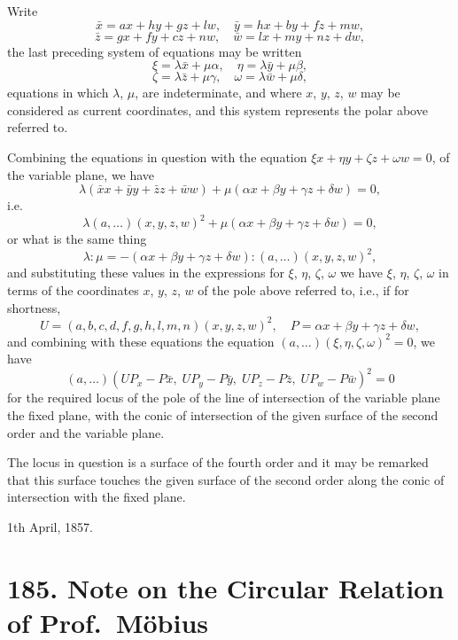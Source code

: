 \documentclass[12pt,a4paper]{article}
\theoremstyle{plain}
\theoremstyle{definition}
\begin{document}
\newpage
[184]

Write
\[
\bar{x} = ax + hy + gz + lw, \quad
\bar{y} = hx + by + fz + mw,
\]
\[
\bar{z} = gx + fy + cz + nw, \quad
\bar{w} = lx + my + nz + dw,
\]
the last preceding system of equations may be written
\[
\xi = \lambda \bar{x} + \mu \alpha, \quad
\eta = \lambda \bar{y} + \mu \beta,
\]
\[
\zeta = \lambda \bar{z} + \mu \gamma, \quad
\omega = \lambda \bar{w} + \mu \delta,
\]
equations in which $\lambda$, $\mu$, are indeterminate, and where $x$, $y$, $z$, $w$ may be considered as current coordinates, and this system represents the polar above referred to.

Combining the equations in question with the equation $\xi x + \eta y + \zeta z + \omega w = 0$, of the variable plane, we have
\[
\lambda(\bar{x}x + \bar{y}y + \bar{z}z + \bar{w}w) + \mu(\alpha x + \beta y + \gamma z + \delta w) = 0,
\]
i.e.
\[
\lambda(a, \ldots)(x, y, z, w)^2 + \mu(\alpha x + \beta y + \gamma z + \delta w) = 0,
\]
or what is the same thing
\[
\lambda : \mu = -(\alpha x + \beta y + \gamma z + \delta w) : (a, \ldots)(x, y, z, w)^2,
\]
and substituting these values in the expressions for $\xi$, $\eta$, $\zeta$, $\omega$ we have $\xi$, $\eta$, $\zeta$, $\omega$ in terms of the coordinates $x$, $y$, $z$, $w$ of the pole above referred to, i.e., if for shortness,
\[
U = (a, b, c, d, f, g, h, l, m, n)(x, y, z, w)^2, \quad P = \alpha x + \beta y + \gamma z + \delta w,
\]
and combining with these equations the equation $(a, \ldots)(\xi, \eta, \zeta, \omega)^2 = 0$, we have
\[
(a, \ldots)(UP_x - P\bar{x}, \; UP_y - P\bar{y}, \; UP_z - P\bar{z}, \; UP_w - P\bar{w})^2 = 0
\]
for the required locus of the pole of the line of intersection of the variable plane the fixed plane, with the conic of intersection of the given surface of the second order and the variable plane.

The locus in question is a surface of the fourth order and it may be remarked that this surface touches the given surface of the second order along the conic of intersection with the fixed plane.

\begin{flushright}
1th April, 1857.
\end{flushright}


\newpage
\section*{185. Note on the Circular Relation of Prof.\ M\"{o}bius}
\end{document}
